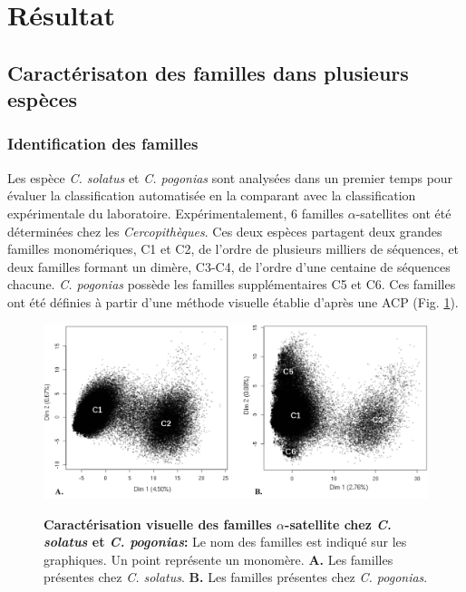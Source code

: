 \documentclass[12pt,a4paper]{article}
\begin{document}
\section{Résultat}
	\subsection{Caractérisaton des familles dans plusieurs espèces}
			\subsubsection{Identification des familles}
			Les espèce \textit{C. solatus} et \textit{C. pogonias} sont analysées dans un premier temps pour évaluer la classification automatisée en la comparant avec la classification expérimentale du laboratoire. Expérimentalement, 6 familles $\alpha$-satellites ont été déterminées chez les \textit{Cercopithèques}. Ces deux espèces partagent deux grandes familles monomériques, C1 et C2, de l'ordre de plusieurs milliers de séquences, et deux familles formant un dimère, C3-C4, de l'ordre d'une centaine de séquences chacune. \textit{C. pogonias} possède les familles supplémentaires C5 et C6. Ces familles ont été définies à partir d'une méthode visuelle établie d'après une ACP (Fig. \ref{fig:ACP_exp}).\\
	\begin{figure}	
		\includegraphics[scale=0.4]{img/ACP_experimental.png}  \\
		\caption{\textbf{Caractérisation visuelle des familles $\alpha$-satellite chez \textit{C. solatus} et \textit{C. pogonias}:}\label{fig:ACP_exp}
		Le nom des familles est indiqué sur les graphiques. Un point représente un monomère. \textbf{A.} Les familles présentes chez \textit{C. solatus}. \textbf{B.} Les familles présentes chez \textit{C. pogonias}.} 
	\end{figure}
	
\end{document}
